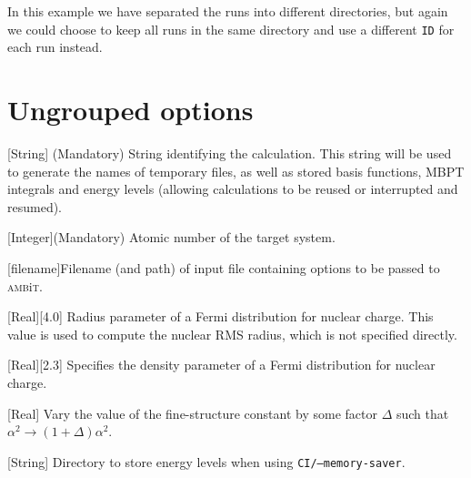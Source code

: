 \documentclass{report}
\newcommand{\ambit}{\textsc{amb}{\footnotesize i}\textsc{t}}
\begin{document}
In this example we have separated the runs into different directories, but again we could choose to keep all runs in the same directory and use a different \texttt{ID} for each run instead.
	
\section{Ungrouped options}
\label{sec:ungrouped}

[String]{%
(Mandatory) String identifying the calculation. This string will be used to generate the names of
temporary files, as well as stored basis functions, MBPT integrals and energy levels
(allowing calculations to be reused or interrupted and resumed).%
}

[Integer]{(Mandatory) Atomic number of the target system.}

[filename]{Filename (and path) of input file containing options to be passed to \ambit.}

[Real][4.0]{%
Radius parameter of a Fermi distribution for nuclear charge. This value is
used to compute the nuclear RMS radius, which is not specified directly.%
}

[Real][2.3]{%
Specifies the density parameter of a Fermi distribution for nuclear charge.%
}

[Real]{%
Vary the value of the fine-structure constant by some factor $\Delta$ such that
$\alpha^2 \to (1 + \Delta)\alpha^2$.%
}

[String]{%
Directory to store energy levels when using \texttt{CI/--memory-saver}.%
}



\end{document}
